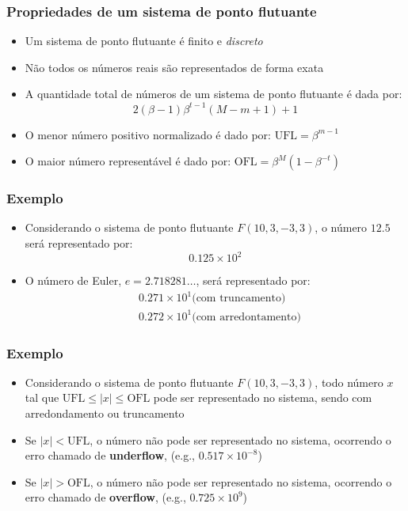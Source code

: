 \documentclass{beamer}
\begin{document}
\begin{frame}
	\frametitle{Propriedades de um sistema de ponto flutuante}
	\begin{itemize}
		\item Um sistema de ponto flutuante é finito e \textit{discreto}
		\item Não todos os números reais são representados de forma exata
		\item A quantidade total de números de um sistema de ponto flutuante é dada por:
		\begin{equation*}
			2(\beta - 1)\beta^{t - 1}(M - m + 1) + 1
		\end{equation*}
		\item O menor número positivo normalizado é dado por: $ \mbox{UFL} = \beta^{m - 1} $
		\item O maior número representável é dado por: $ \mbox{OFL} = \beta^{M}(1 - \beta^{-t}) $
	\end{itemize}
\end{frame}

\begin{frame}
	\frametitle{Exemplo}
	\begin{itemize}
		\item Considerando o sistema de ponto flutuante $ F(10, 3, -3, 3) $, o número $ 12.5 $ será representado por:
		\begin{equation*}
			0.125 \times 10^{2}
		\end{equation*}
		\item O número de Euler, $ e = 2.718281\ldots $, será representado por:
		\begin{equation*}
			\begin{aligned}
				&0.271 \times 10^{1} \mbox{(com truncamento)}\\
				&0.272 \times 10^{1} \mbox{(com arredontamento)}
			\end{aligned}
		\end{equation*}
	\end{itemize}	
\end{frame}

\begin{frame}
	\frametitle{Exemplo}
	\begin{itemize}
		\item Considerando o sistema de ponto flutuante $ F(10, 3, -3, 3) $, todo número $ x $ tal que $\mbox{UFL} \leq | x | \leq \mbox{OFL}$ pode ser representado no sistema, sendo com arredondamento ou truncamento
		\item Se $ |x| < \mbox{UFL} $, o número não pode ser representado no sistema, ocorrendo o erro chamado de \textbf{underflow}, (e.g., $ 0.517 \times 10^{-8} $)
		\item Se $ |x| > \mbox{OFL} $, o número não pode ser representado no sistema, ocorrendo o erro chamado de \textbf{overflow}, (e.g., $ 0.725 \times 10^{9} $)
	\end{itemize}	
\end{frame}
\end{document}
